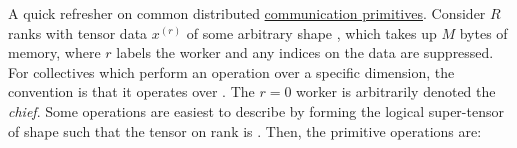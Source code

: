\documentclass[11pt]{article}
\begin{document}
A quick refresher on common distributed
\href{https://docs.nvidia.com/deeplearning/nccl/user-guide/docs/usage/collectives.html}{communication
    primitives}.  Consider $ R $ ranks with tensor data $ x ^{ (r) }  $ of some arbitrary shape
    , which takes up $ M $ bytes of memory, where $ r $ labels the worker and any
    indices on the data are suppressed. For collectives which perform an operation over a specific
    dimension, the  convention is that it operates over . The $ r=0
    $ worker is arbitrarily denoted the \textit{chief}. Some operations are easiest to describe by
    forming the logical super-tensor  of shape
     such that the tensor on rank  is .
    Then, the primitive operations are:
\end{document}

